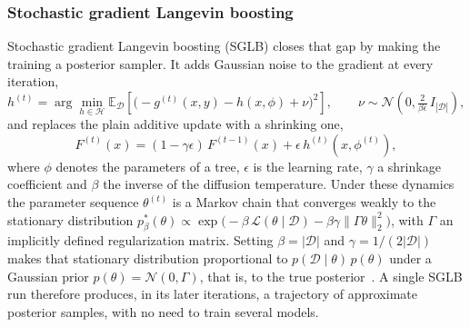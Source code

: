     \subsubsection{Stochastic gradient Langevin boosting} 
        Stochastic gradient Langevin boosting (SGLB) closes that gap by making the training a posterior sampler. It adds Gaussian noise to the gradient at every iteration,
        \begin{equation}
        h^{(t)} = \arg\min_{h \in \mathcal{H}}
        \mathbb{E}_{\mathcal{D}}\!\left[ \bigl( -g^{(t)}(x, y) - h(x, \phi) + \nu \bigr)^{2} \right],
        \qquad
        \nu \sim \mathcal{N}\!\left( 0, \tfrac{2}{\beta \epsilon}\, I_{|\mathcal{D}|} \right),
        \label{eq:bg:unc:sglbnoise}
        \end{equation}
        and replaces the plain additive update with a shrinking one,
        \begin{equation}
        F^{(t)}(x) = (1 - \gamma \epsilon)\, F^{(t-1)}(x) + \epsilon\, h^{(t)}(x, \phi^{(t)}),
        \label{eq:bg:unc:sglbupdate}
        \end{equation}
        where $\phi$ denotes the parameters of a tree, $\epsilon$ is the
        learning rate, $\gamma$ a shrinkage coefficient and $\beta$ the inverse
        of the diffusion temperature. Under these dynamics the parameter sequence $\theta^{(t)}$ is a Markov chain
        that converges weakly to the stationary distribution
        $p^{*}_{\beta}(\theta) \propto
        \exp\!\bigl( -\beta\, \mathcal{L}(\theta \mid \mathcal{D})
        - \beta \gamma \lVert \Gamma \theta \rVert_2^2 \bigr)$,
        with $\Gamma$ an implicitly defined regularization matrix. Setting
        $\beta = \lvert \mathcal{D} \rvert$ and $\gamma = 1 / (2\lvert \mathcal{D} \rvert)$
        makes that stationary distribution proportional to
        $p(\mathcal{D} \mid \theta)\, p(\theta)$ under a Gaussian prior $p(\theta) = \mathcal{N}(0,\Gamma)$, that is, to
        the true posterior~\cite{ustimenko2021sglb}. A single SGLB run therefore
        produces, in its later iterations, a trajectory of approximate posterior
        samples, with no need to train several models.
    
